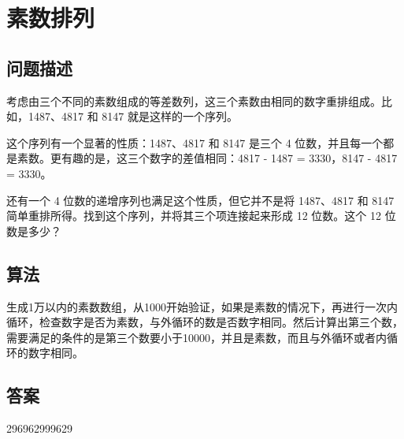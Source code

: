 \section{素数排列}
\subsection{问题描述}
\begin{tcolorbox}
考虑由三个不同的素数组成的等差数列，这三个素数由相同的数字重排组成。比如，1487、4817 和 8147 就是这样的一个序列。

这个序列有一个显著的性质：1487、4817 和 8147 是三个 4 位数，并且每一个都是素数。更有趣的是，这三个数字的差值相同：4817 - 1487 = 3330，8147 - 4817 = 3330。

还有一个 4 位数的递增序列也满足这个性质，但它并不是将 1487、4817 和 8147 简单重排所得。找到这个序列，并将其三个项连接起来形成 12 位数。这个 12 位数是多少？
\end{tcolorbox}

\subsection{算法}
生成1万以内的素数数组，从1000开始验证，如果是素数的情况下，再进行一次内循环，检查数字是否为素数，与外循环的数是否数字相同。然后计算出第三个数，需要满足的条件的是第三个数要小于10000，并且是素数，而且与外循环或者内循环的数字相同。

\subsection{答案}
296962999629
